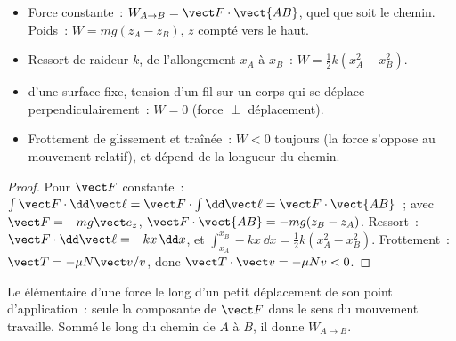 \begin{proposition}\label{prop:b1:work-and-energy:works}
\begin{itemize}
  \item Force constante~: $W_{A\to B} = \vect F\cdot\vect{AB}$, quel que
        soit le chemin. Poids~: $W = mg(z_A - z_B)$, $z$ compté vers le haut.
  \item Ressort de raideur $k$, de l'allongement $x_A$ à $x_B$~:
        $W = \tfrac12 k(x_A^2 - x_B^2)$.
  \item {} d'une surface fixe, tension d'un fil sur un
        corps qui se déplace perpendiculairement~: $W = 0$ (force $\perp$ déplacement).
  \item Frottement de glissement et traînée~: $W < 0$ toujours (la force
        s'oppose au mouvement relatif), et dépend de la longueur du chemin.
\end{itemize}
\end{proposition}

\begin{proof}
Pour $\vect F$ constante~: $\int\vect F\cdot\dd\vect\ell = \vect F\cdot\int\dd\vect\ell
= \vect F\cdot\vect{AB}$~; avec $\vect F = -mg\vect e_z$, $\vect F\cdot\vect{AB}
= -mg(z_B - z_A)$. Ressort~: $\vect F\cdot\dd\vect\ell = -kx\,\dd x$, et
$\int_{x_A}^{x_B}-kx\,\dd x = \tfrac12 k(x_A^2 - x_B^2)$. Frottement~: $\vect T
= -\mu N\vect v/v$, donc $\vect T\cdot\vect v = -\mu Nv < 0$.
\end{proof}

\begin{omfigure}

{\small Le  élémentaire d'une force le long d'un petit
déplacement de son point d'application~: seule la composante de
$\vect F$ dans le sens du mouvement travaille. Sommé le long du chemin
de $A$ à $B$, il donne $W_{A\to B}$.}
\end{omfigure}


